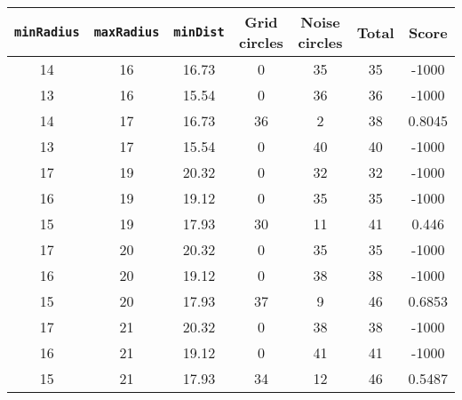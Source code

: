 \documentclass[letterpaper, 12pt]{article}
\begin{document}
\begin{longtable}{|c|c|c|c|c|c|c|}
\hline
\textbf{\texttt{minRadius}} & \textbf{\texttt{maxRadius}} & \textbf{\texttt{minDist}} & \textbf{Grid circles} & \textbf{Noise circles} & \textbf{Total} & \textbf{Score} \\
\hline
14 & 16 & 16.73 & 0 & 35 & 35 & -1000 \\
\hline
13 & 16 & 15.54 & 0 & 36 & 36 & -1000 \\
\hline
14 & 17 & 16.73 & 36 & 2 & 38 & 0.8045 \\
\hline
13 & 17 & 15.54 & 0 & 40 & 40 & -1000 \\
\hline
17 & 19 & 20.32 & 0 & 32 & 32 & -1000 \\
\hline
16 & 19 & 19.12 & 0 & 35 & 35 & -1000 \\
\hline
15 & 19 & 17.93 & 30 & 11 & 41 & 0.446 \\
\hline
17 & 20 & 20.32 & 0 & 35 & 35 & -1000 \\
\hline
16 & 20 & 19.12 & 0 & 38 & 38 & -1000 \\
\hline
15 & 20 & 17.93 & 37 & 9 & 46 & 0.6853 \\
\hline
17 & 21 & 20.32 & 0 & 38 & 38 & -1000 \\
\hline
16 & 21 & 19.12 & 0 & 41 & 41 & -1000 \\
\hline
15 & 21 & 17.93 & 34 & 12 & 46 & 0.5487 \\
\hline
\end{longtable}
\end{document}
